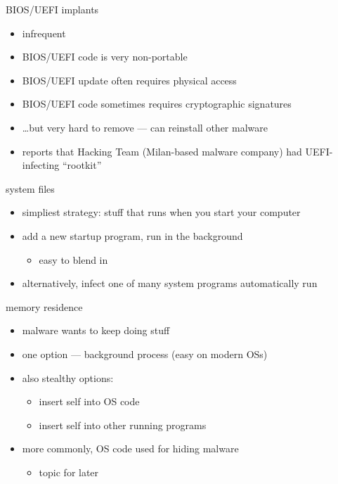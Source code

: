 
\begin{frame}{BIOS/UEFI implants}
    \begin{itemize}
    \item infrequent
    \item BIOS/UEFI code is very non-portable
    \item BIOS/UEFI update often requires physical access
    \item BIOS/UEFI code sometimes requires cryptographic signatures
    \item \ldots but very hard to remove --- can reinstall other malware
    \item reports that Hacking Team (Milan-based malware company) had UEFI-infecting ``rootkit''
    \end{itemize}
\end{frame}


\begin{frame}{system files}
    \begin{itemize}
    \item simpliest strategy: stuff that runs when you start your computer
    \item add a new startup program, run in the background
        \begin{itemize}
        \item easy to blend in
        \end{itemize}
    \vspace{.5cm}
    \item alternatively, infect one of many system programs automatically run
    \end{itemize}

\end{frame}

\begin{frame}{memory residence}
    \begin{itemize}
    \item malware wants to keep doing stuff
    \item one option --- background process (easy on modern OSs)
    \item also stealthy options:
        \begin{itemize}
        \item insert self into OS code
        \item insert self into other running programs
        \end{itemize}
    \item more commonly, OS code used for hiding malware
        \begin{itemize}
        \item topic for later
        \end{itemize}
    \end{itemize}
\end{frame}

